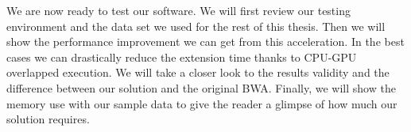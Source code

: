 We are now ready to test our software. We will first review our testing environment and the data set we used for the rest of this thesis. Then we will show the performance improvement we can get from this acceleration. In the best cases we can drastically reduce the extension time thanks to CPU-GPU overlapped execution. We will take a closer look to the results validity and the difference between our solution and the original BWA. Finally, we will show the memory use with our sample data to give the reader a glimpse of how much our solution requires.